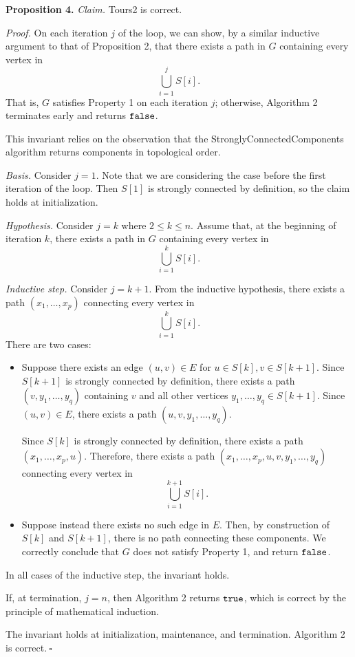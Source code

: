 \begin{enumerate}
\begin{solution}
\textbf{Proposition 4. }\textit{Claim. }{\sc Tours2} is correct.

\textit{Proof. }On each iteration $j$ of the loop, we can show, by a similar inductive argument to that of Proposition 2, that there exists a path in $G$ containing every vertex in \[\bigcup_{i=1}^jS[i].\] That is, $G$ satisfies Property 1 on each iteration $j$; otherwise, Algorithm 2 terminates early and returns $\verb|false|$.

This invariant relies on the observation that the {\sc StronglyConnectedComponents} algorithm returns components in topological order.

\textit{Basis. }Consider $j=1$. Note that we are considering the case before the first iteration of the loop. Then $S[1]$ is strongly connected by definition, so the claim holds at initialization.

\textit{Hypothesis. }Consider $j=k$ where $2\leq k\leq n$. Assume that, at the beginning of iteration $k$, there exists a path in $G$ containing every vertex in \[\bigcup_{i=1}^kS[i].\]

\textit{Inductive step. }Consider $j=k+1$. From the inductive hypothesis, there exists a path $(x_1,\dots,x_p)$ connecting every vertex in \[\bigcup_{i=1}^kS[i].\] There are two cases:

\begin{itemize}
\item Suppose there exists an edge $(u,v)\in E$ for $u\in S[k],v\in S[k+1]$. Since $S[k+1]$ is strongly connected by definition, there exists a path $(v,y_1,\dots,y_q)$ containing $v$ and all other vertices $y_1,\dots,y_q\in S[k+1]$. Since $(u,v)\in E$, there exists a path $(u,v,y_1,\dots,y_q)$.

Since $S[k]$ is strongly connected by definition, there exists a path $(x_1,\dots,x_p,u)$. Therefore, there exists a path $(x_1,\dots,x_p,u,v,y_1,\dots,y_q)$ connecting every vertex in
\[\bigcup_{i=1}^{k+1}S[i].\]
\item Suppose instead there exists no such edge in $E$. Then, by construction of $S[k]$ and $S[k+1]$, there is no path connecting these components. We correctly conclude that $G$ does not satisfy Property 1, and return $\verb|false|$. 
\end{itemize}
In all cases of the inductive step, the invariant holds.

If, at termination, $j=n$, then Algorithm 2 returns $\verb|true|$, which is correct by the principle of mathematical induction.

The invariant holds at initialization, maintenance, and termination. Algorithm 2 is correct.$~\square$
\end{solution}
\end{enumerate}
\newpage
